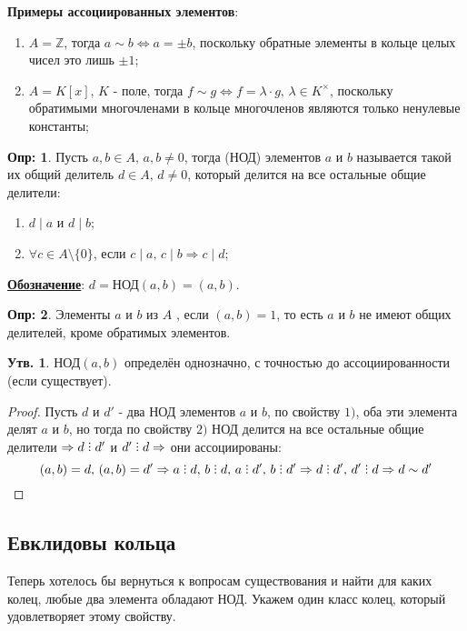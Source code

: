 \documentclass[12pt]{article}
\newcommand{\MZ}{\mathbb{Z}}
\theoremstyle{definition}
\newtheorem{defn}{Опр:}
\newtheorem{prop}{Утв.}
\DeclareRobustCommand{\divby}{%
	\mathrel{\text{\vbox{\baselineskip.65ex\lineskiplimit0pt\hbox{.}\hbox{.}\hbox{.}}}}%
}
\begin{document}
\textbf{Примеры ассоциированных элементов}:
\begin{enumerate}[label=\arabic*)]
	\item $A = \MZ$, тогда $a \sim b \Leftrightarrow a = \pm b$, поскольку обратные элементы в кольце целых чисел это лишь $\pm 1$;
	\item $A = K[x], \, K$ - поле, тогда $f\sim g \Leftrightarrow f = \lambda{\cdot}g, \, \lambda \in K^{\times}$, поскольку обратимыми многочленами в кольце многочленов являются только ненулевые константы;
\end{enumerate}

\begin{defn}
	Пусть $a,b \in A,\, a,b \neq 0$, тогда  (НОД) элементов $a$ и $b$ называется такой их общий делитель $d \in A, \, d\neq 0$, который делится на все остальные общие делители:
	\begin{enumerate}[label=\arabic*)]
		\item $d \mid a$ и $d \mid b$;
		\item $\forall c \in A\setminus \{0\}$, если $c \mid a, \, c\mid b \Rightarrow c \mid d$;
	\end{enumerate}
	\textbf{\uline{Обозначение}}: $d = \text{НОД}(a,b) = (a,b)$.
\end{defn}
\begin{defn}
	Элементы $a$ и $b$ из $A$ , если $(a,b) = 1$, то есть $a$ и $b$ не имеют общих делителей, кроме обратимых элементов.
\end{defn}

\begin{prop}
	НОД$(a,b)$ определён однозначно, с точностью до ассоциированности (если существует).
\end{prop}
\begin{proof}
	Пусть $d$ и $d'$ - два НОД элементов $a$ и $b$, по свойству $1)$, оба эти элемента делят $a$ и $b$, но тогда по свойству $2)$ НОД делится на все остальные общие делители $\Rightarrow d \divby d'$ и $d' \divby d \Rightarrow$ они ассоциированы:
	$$
		(a,b) = d, \, (a,b) = d' \Rightarrow a \divby d, \, b \divby d, \, a \divby d', \, b \divby d' \Rightarrow d \divby d', \, d' \divby d \Rightarrow d \sim d'
	$$
\end{proof}

\subsection*{Евклидовы кольца}
Теперь хотелось бы вернуться к вопросам существования и найти для каких колец, любые два элемента обладают НОД. Укажем один класс колец, который удовлетворяет этому свойству.
\end{document}
